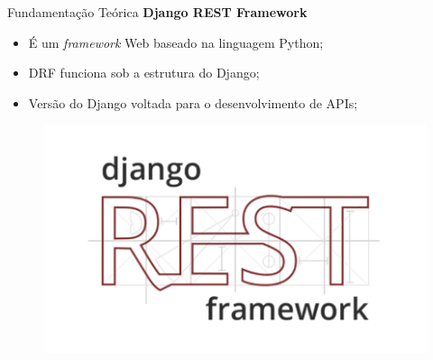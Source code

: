 \documentclass{libs/ufc_format}
\begin{document}
\begin{frame}{Fundamentação Teórica}
    \textbf{Django REST Framework}\nocite{django}\let\thefootnote\relax{}
    \begin{multicols}{2}
    \begin{itemize}
        \item É um \textit{framework} Web baseado na linguagem Python;
        \item DRF funciona sob a estrutura do Django;
        \item Versão do Django voltada para o desenvolvimento de APIs;
    \end{itemize}
        \begin{figure}[H]
            \centering
            \includegraphics[width=1\linewidth]{figuras/logo-drf.pdf}
            \captionsetup{justification=centering}
            \label{fig:modelo-rest-api}
        \end{figure}
    \end{multicols}
\end{frame}
\end{document}
